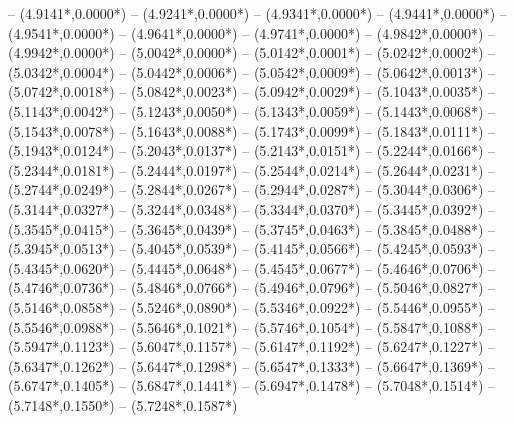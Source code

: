 {	-- ({4.9141*\dx},{0.0000*\dy})
	-- ({4.9241*\dx},{0.0000*\dy})
	-- ({4.9341*\dx},{0.0000*\dy})
	-- ({4.9441*\dx},{0.0000*\dy})
	-- ({4.9541*\dx},{0.0000*\dy})
	-- ({4.9641*\dx},{0.0000*\dy})
	-- ({4.9741*\dx},{0.0000*\dy})
	-- ({4.9842*\dx},{0.0000*\dy})
	-- ({4.9942*\dx},{0.0000*\dy})
	-- ({5.0042*\dx},{0.0000*\dy})
	-- ({5.0142*\dx},{0.0001*\dy})
	-- ({5.0242*\dx},{0.0002*\dy})
	-- ({5.0342*\dx},{0.0004*\dy})
	-- ({5.0442*\dx},{0.0006*\dy})
	-- ({5.0542*\dx},{0.0009*\dy})
	-- ({5.0642*\dx},{0.0013*\dy})
	-- ({5.0742*\dx},{0.0018*\dy})
	-- ({5.0842*\dx},{0.0023*\dy})
	-- ({5.0942*\dx},{0.0029*\dy})
	-- ({5.1043*\dx},{0.0035*\dy})
	-- ({5.1143*\dx},{0.0042*\dy})
	-- ({5.1243*\dx},{0.0050*\dy})
	-- ({5.1343*\dx},{0.0059*\dy})
	-- ({5.1443*\dx},{0.0068*\dy})
	-- ({5.1543*\dx},{0.0078*\dy})
	-- ({5.1643*\dx},{0.0088*\dy})
	-- ({5.1743*\dx},{0.0099*\dy})
	-- ({5.1843*\dx},{0.0111*\dy})
	-- ({5.1943*\dx},{0.0124*\dy})
	-- ({5.2043*\dx},{0.0137*\dy})
	-- ({5.2143*\dx},{0.0151*\dy})
	-- ({5.2244*\dx},{0.0166*\dy})
	-- ({5.2344*\dx},{0.0181*\dy})
	-- ({5.2444*\dx},{0.0197*\dy})
	-- ({5.2544*\dx},{0.0214*\dy})
	-- ({5.2644*\dx},{0.0231*\dy})
	-- ({5.2744*\dx},{0.0249*\dy})
	-- ({5.2844*\dx},{0.0267*\dy})
	-- ({5.2944*\dx},{0.0287*\dy})
	-- ({5.3044*\dx},{0.0306*\dy})
	-- ({5.3144*\dx},{0.0327*\dy})
	-- ({5.3244*\dx},{0.0348*\dy})
	-- ({5.3344*\dx},{0.0370*\dy})
	-- ({5.3445*\dx},{0.0392*\dy})
	-- ({5.3545*\dx},{0.0415*\dy})
	-- ({5.3645*\dx},{0.0439*\dy})
	-- ({5.3745*\dx},{0.0463*\dy})
	-- ({5.3845*\dx},{0.0488*\dy})
	-- ({5.3945*\dx},{0.0513*\dy})
	-- ({5.4045*\dx},{0.0539*\dy})
	-- ({5.4145*\dx},{0.0566*\dy})
	-- ({5.4245*\dx},{0.0593*\dy})
	-- ({5.4345*\dx},{0.0620*\dy})
	-- ({5.4445*\dx},{0.0648*\dy})
	-- ({5.4545*\dx},{0.0677*\dy})
	-- ({5.4646*\dx},{0.0706*\dy})
	-- ({5.4746*\dx},{0.0736*\dy})
	-- ({5.4846*\dx},{0.0766*\dy})
	-- ({5.4946*\dx},{0.0796*\dy})
	-- ({5.5046*\dx},{0.0827*\dy})
	-- ({5.5146*\dx},{0.0858*\dy})
	-- ({5.5246*\dx},{0.0890*\dy})
	-- ({5.5346*\dx},{0.0922*\dy})
	-- ({5.5446*\dx},{0.0955*\dy})
	-- ({5.5546*\dx},{0.0988*\dy})
	-- ({5.5646*\dx},{0.1021*\dy})
	-- ({5.5746*\dx},{0.1054*\dy})
	-- ({5.5847*\dx},{0.1088*\dy})
	-- ({5.5947*\dx},{0.1123*\dy})
	-- ({5.6047*\dx},{0.1157*\dy})
	-- ({5.6147*\dx},{0.1192*\dy})
	-- ({5.6247*\dx},{0.1227*\dy})
	-- ({5.6347*\dx},{0.1262*\dy})
	-- ({5.6447*\dx},{0.1298*\dy})
	-- ({5.6547*\dx},{0.1333*\dy})
	-- ({5.6647*\dx},{0.1369*\dy})
	-- ({5.6747*\dx},{0.1405*\dy})
	-- ({5.6847*\dx},{0.1441*\dy})
	-- ({5.6947*\dx},{0.1478*\dy})
	-- ({5.7048*\dx},{0.1514*\dy})
	-- ({5.7148*\dx},{0.1550*\dy})
	-- ({5.7248*\dx},{0.1587*\dy})
}
